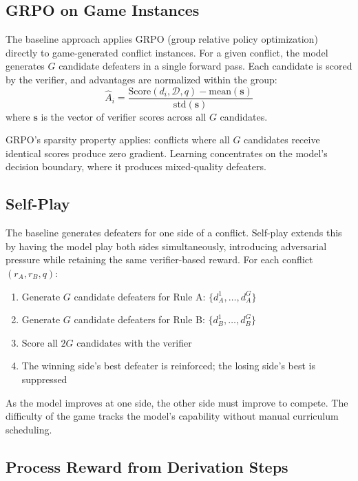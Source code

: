 \documentclass[11pt]{article}
\newcommand{\D}{\mathcal{D}}
\newcommand{\Score}{\mathrm{Score}}
\begin{document}
\subsection{GRPO on Game Instances}

The baseline approach applies GRPO (group relative policy optimization) directly to game-generated conflict instances. For a given conflict, the model generates $G$ candidate defeaters in a single forward pass. Each candidate is scored by the verifier, and advantages are normalized within the group:
\[
    \hat{A}_i = \frac{\Score(d_i, \D, q) - \mathrm{mean}(\mathbf{s})}{\mathrm{std}(\mathbf{s})}
\]
where $\mathbf{s}$ is the vector of verifier scores across all $G$ candidates.

GRPO's sparsity property applies: conflicts where all $G$ candidates receive identical scores produce zero gradient. Learning concentrates on the model's decision boundary, where it produces mixed-quality defeaters.

\subsection{Self-Play}

The baseline generates defeaters for one side of a conflict. Self-play extends this by having the model play both sides simultaneously, introducing adversarial pressure while retaining the same verifier-based reward. For each conflict $(r_A, r_B, q)$:
\begin{enumerate}[nosep]
    \item Generate $G$ candidate defeaters for Rule A: $\{d_A^1, \ldots, d_A^G\}$
    \item Generate $G$ candidate defeaters for Rule B: $\{d_B^1, \ldots, d_B^G\}$
    \item Score all $2G$ candidates with the verifier
    \item The winning side's best defeater is reinforced; the losing side's best is suppressed
\end{enumerate}

As the model improves at one side, the other side must improve to compete. The difficulty of the game tracks the model's capability without manual curriculum scheduling.

\subsection{Process Reward from Derivation Steps}
\end{document}
